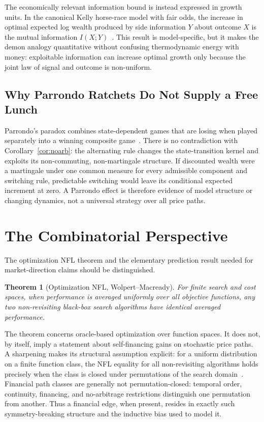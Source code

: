 \documentclass[aps,pra,reprint,superscriptaddress,amsmath,amssymb,floatfix]{revtex4-2}
\theoremstyle{plain}
\newtheorem{theorem}{Theorem}
\theoremstyle{definition}
\theoremstyle{remark}
\begin{document}
The economically relevant information bound is instead expressed in growth
units. In the canonical Kelly horse-race model with fair odds, the increase in
optimal expected log wealth produced by side information \(Y\) about outcome
\(X\) is the mutual information \(I(X;Y)\)~\cite{Kelly1956}. This result is
model-specific, but it makes the demon analogy quantitative without confusing
thermodynamic energy with money: exploitable information can increase optimal
growth only because the joint law of signal and outcome is non-uniform.

\subsection{Why Parrondo Ratchets Do Not Supply a Free Lunch}

Parrondo's paradox combines state-dependent games that are losing when played
separately into a winning composite game~\cite{HarmerAbbott1999}. There is no
contradiction with Corollary~\ref{cor:noarb}: the alternating rule changes the
state-transition kernel and exploits its non-commuting, non-martingale
structure. If discounted wealth were a martingale under one common measure for
every admissible component and switching rule, predictable switching would
leave its conditional expected increment at zero. A Parrondo effect is
therefore evidence of model structure or changing dynamics, not a universal
strategy over all price paths.

\section{The Combinatorial Perspective}
\label{sec:nfl}

The optimization NFL theorem and the elementary prediction result needed for
market-direction claims should be distinguished.

\begin{theorem}[Optimization NFL, Wolpert--Macready]
  \label{thm:nfl}
  For finite search and cost spaces, when performance is averaged uniformly
  over all objective functions, any two non-revisiting black-box search
  algorithms have identical averaged performance.
\end{theorem}

The theorem concerns oracle-based optimization over function spaces. It does
not, by itself, imply a statement about self-financing gains on stochastic
price paths. A sharpening makes its structural assumption explicit: for a
uniform distribution on a finite function class, the NFL equality for all
non-revisiting algorithms holds precisely when the class is closed under
permutations of the search domain~\cite{SchumacherVoseWhitley2001}. Financial
path classes are generally not permutation-closed: temporal order, continuity,
financing, and no-arbitrage restrictions distinguish one permutation from
another. Thus a financial edge, when present, resides in exactly such
symmetry-breaking structure and the inductive bias used to model it.
\end{document}
